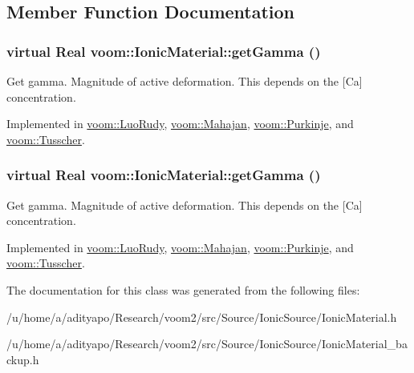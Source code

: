 \subsection{Member Function Documentation}
\hypertarget{classvoom_1_1_ionic_material_a98f1fa5bc5fa9ff6abfcd302111f8eac}{
\subsubsection[{getGamma}]{\setlength{\rightskip}{0pt plus 5cm}virtual Real voom::IonicMaterial::getGamma ()}}
\label{classvoom_1_1_ionic_material_a98f1fa5bc5fa9ff6abfcd302111f8eac}
Get gamma. Magnitude of active deformation. This depends on the \mbox{[}Ca\mbox{]} concentration. 

Implemented in \hyperlink{classvoom_1_1_luo_rudy_a698189fa1a8c96e7b443f95a9d7887be}{voom::LuoRudy}, \hyperlink{classvoom_1_1_mahajan_a909c20c75a95d45e00ead8930b4b3287}{voom::Mahajan}, \hyperlink{classvoom_1_1_purkinje_a337aa8f4b1ea0bd6f08635950cc39a2d}{voom::Purkinje}, and \hyperlink{classvoom_1_1_tusscher_a1c3c2dd28860736ebeb0f602a6b8caa8}{voom::Tusscher}.\hypertarget{classvoom_1_1_ionic_material_a98f1fa5bc5fa9ff6abfcd302111f8eac}{
\subsubsection[{getGamma}]{\setlength{\rightskip}{0pt plus 5cm}virtual Real voom::IonicMaterial::getGamma ()}}
\label{classvoom_1_1_ionic_material_a98f1fa5bc5fa9ff6abfcd302111f8eac}
Get gamma. Magnitude of active deformation. This depends on the \mbox{[}Ca\mbox{]} concentration. 

Implemented in \hyperlink{classvoom_1_1_luo_rudy_a698189fa1a8c96e7b443f95a9d7887be}{voom::LuoRudy}, \hyperlink{classvoom_1_1_mahajan_a909c20c75a95d45e00ead8930b4b3287}{voom::Mahajan}, \hyperlink{classvoom_1_1_purkinje_a337aa8f4b1ea0bd6f08635950cc39a2d}{voom::Purkinje}, and \hyperlink{classvoom_1_1_tusscher_a1c3c2dd28860736ebeb0f602a6b8caa8}{voom::Tusscher}.

The documentation for this class was generated from the following files:\begin{DoxyCompactItemize}
\item 
/u/home/a/adityapo/Research/voom2/src/Source/IonicSource/IonicMaterial.h\item 
/u/home/a/adityapo/Research/voom2/src/Source/IonicSource/IonicMaterial\_\-backup.h\end{DoxyCompactItemize}
